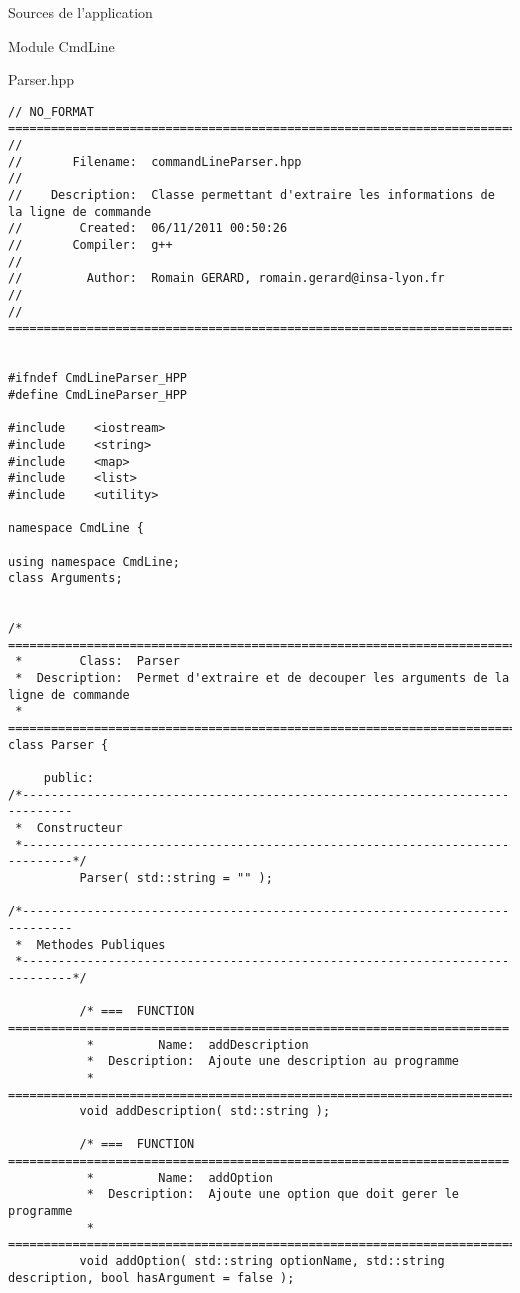 \documentclass{article}
\begin{document}
\begin{section}{Sources de l'application}

  \begin{subsection}{Module CmdLine}
  \begin{paragraph}{Parser.hpp}
      \begin{verbatim}
// NO_FORMAT ===========================================================================
//
//       Filename:  commandLineParser.hpp
//
//    Description:  Classe permettant d'extraire les informations de la ligne de commande
//        Created:  06/11/2011 00:50:26
//       Compiler:  g++
//
//         Author:  Romain GERARD, romain.gerard@insa-lyon.fr
//
// =====================================================================================


#ifndef CmdLineParser_HPP
#define CmdLineParser_HPP

#include    <iostream>
#include    <string>
#include    <map>
#include    <list>
#include    <utility>

namespace CmdLine {

using namespace CmdLine;
class Arguments;


/* =====================================================================================
 *        Class:  Parser
 *  Description:  Permet d'extraire et de decouper les arguments de la ligne de commande
 * =====================================================================================*/
class Parser {

     public:
/*-----------------------------------------------------------------------------
 *  Constructeur
 *-----------------------------------------------------------------------------*/
          Parser( std::string = "" );

/*-----------------------------------------------------------------------------
 *  Methodes Publiques
 *-----------------------------------------------------------------------------*/

          /* ===  FUNCTION  ======================================================================
           *         Name:  addDescription
           *  Description:  Ajoute une description au programme
           * =====================================================================================*/
          void addDescription( std::string );

          /* ===  FUNCTION  ======================================================================
           *         Name:  addOption
           *  Description:  Ajoute une option que doit gerer le programme
           * =====================================================================================*/
          void addOption( std::string optionName, std::string description, bool hasArgument = false );
          

\end{verbatim}
\end{paragraph}
\end{subsection}
\end{section}
\end{document}
